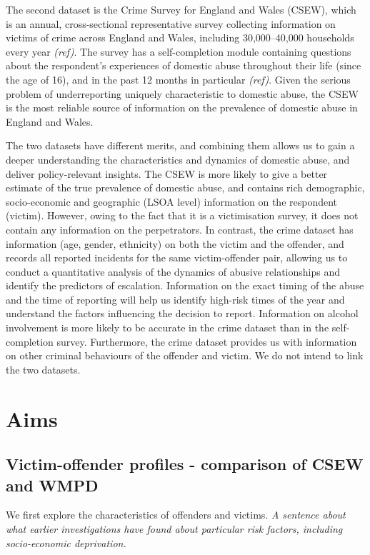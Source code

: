 \documentclass[12pt, letterpaper]{article}
\begin{document}
The second dataset is the Crime Survey for England and Wales (CSEW), which is an annual, cross-sectional representative survey collecting information on victims of crime across England and Wales, including 30,000--40,000 households every year \textit{(ref)}. The survey has a self-completion module containing questions about the respondent's experiences of domestic abuse throughout their life (since the age of 16), and in the past 12 months in particular \textit{(ref)}. Given the serious problem of underreporting uniquely characteristic to domestic abuse, the CSEW is the most reliable source of information on the prevalence of domestic abuse in England and Wales.   

The two datasets have different merits, and combining them allows us to gain a deeper understanding the characteristics and dynamics of domestic abuse, and deliver policy-relevant insights. The CSEW is more likely to give a better estimate of the true prevalence of domestic abuse, and contains rich demographic, socio-economic and geographic (LSOA level) information on the respondent (victim). However, owing to the fact that it is a victimisation survey, it does not contain any information on the perpetrators. In contrast, the crime dataset has information (age, gender, ethnicity) on both the victim and the offender, and records all reported incidents for the same victim-offender pair, allowing us to conduct a quantitative analysis of the dynamics of abusive relationships and identify the predictors of escalation. Information on the exact timing of the abuse and the time of reporting will help us identify high-risk times of the year and understand the factors influencing the decision to report. Information on alcohol involvement is more likely to be accurate in the crime dataset than in the self-completion survey. Furthermore, the crime dataset provides us with information on other criminal behaviours of the offender and victim.  We do not intend to link the two datasets.



\section{Aims}

\subsection{Victim-offender profiles - comparison of CSEW and WMPD}

We first explore the characteristics of offenders and victims. \textit{A sentence about what earlier investigations have found about particular risk factors, including socio-economic deprivation.} 
\end{document}
